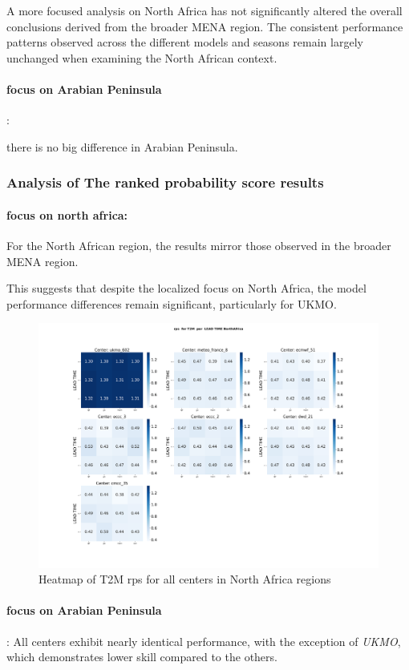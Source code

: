 A more focused analysis on North Africa has not significantly altered the overall conclusions derived from the broader MENA region. The consistent performance patterns observed across the different models and seasons remain largely unchanged when examining the North African context. 

\paragraph{focus on Arabian Peninsula}:

there is no big difference in  Arabian Peninsula.
\subsubsection{Analysis of The ranked probability score results}
\paragraph{focus on north africa:}
For the North African region, the results mirror those observed in the broader MENA region.  

This suggests that despite the localized focus on North Africa, the model performance differences remain significant, particularly for UKMO. 

\begin{figure}[H]
\includegraphics[scale=0.3]{plots/prob/rps/rps_T2M_NorthAfrica.png}

\caption{Heatmap of T2M  rps  for all centers in North Africa regions}
\end{figure}


\paragraph{focus on Arabian Peninsula}:
All centers exhibit nearly identical performance, with the exception of \textit{UKMO}, which demonstrates lower skill compared to the others.
